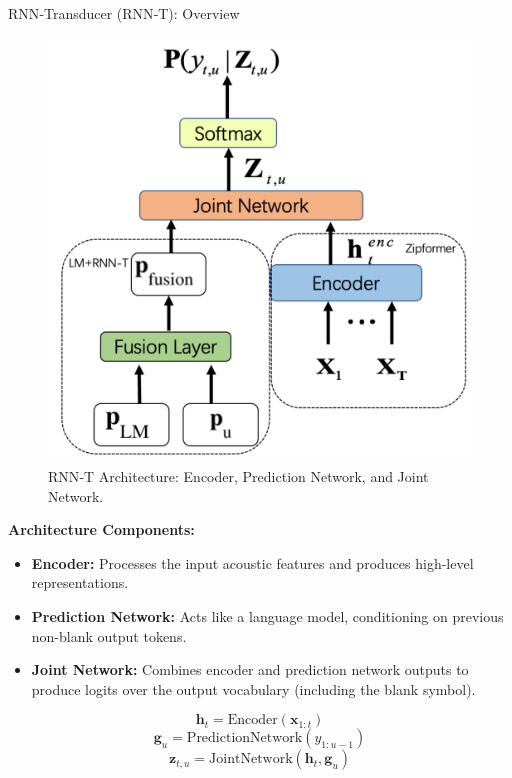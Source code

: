 \begin{frame}[t,allowframebreaks]{RNN‑Transducer (RNN‑T): Overview}
    \begin{figure}[h]
        \centering
        \includegraphics[width=\textwidth,height=0.8\textheight,keepaspectratio]{images/audio-nlp/rnnt_architecture.png}
        \caption*{RNN‑T Architecture: Encoder, Prediction Network, and Joint Network.}
    \end{figure}

    \framebreak

    \textbf{Architecture Components:}
    \begin{itemize}
        \item \textbf{Encoder:} Processes the input acoustic features and produces high-level representations.
        \item \textbf{Prediction Network:} Acts like a language model, conditioning on previous non-blank output tokens.
        \item \textbf{Joint Network:} Combines encoder and prediction network outputs to produce logits over the output vocabulary (including the blank symbol).
    \end{itemize}

    \begin{equation}
        \mathbf{h}_t = \text{Encoder}(\mathbf{x}_{1:t})
    \end{equation}
    \begin{equation}
        \mathbf{g}_u = \text{PredictionNetwork}(y_{1:u-1})
    \end{equation}
    \begin{equation}
        \mathbf{z}_{t,u} = \text{JointNetwork}(\mathbf{h}_t, \mathbf{g}_u)
    \end{equation}


\end{frame}
